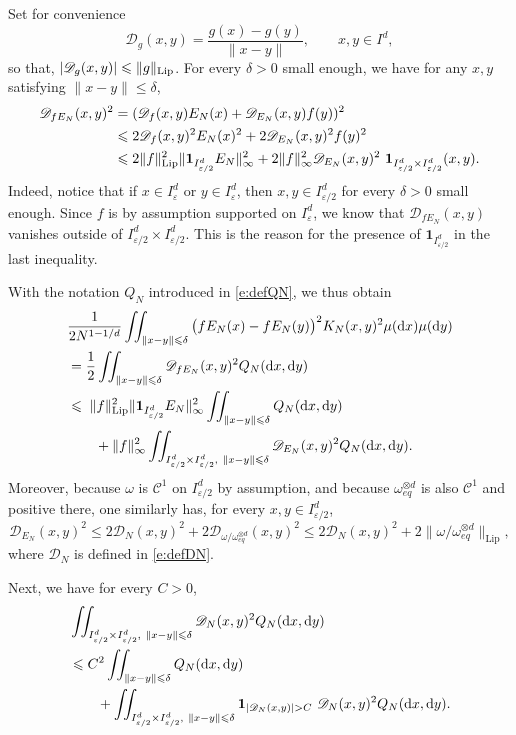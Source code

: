 \documentclass[a4paper,11pt]{article}
\numberwithin{equation}{section}
\theoremstyle{definition}
\newcommand{\eq}{\begin{equation}}
\newcommand{\qe}{\end{equation}}
\newcommand{\bs}{\boldsymbol}
\newcommand{\bv}{\mathbf}
\renewcommand{\leq}{\leqslant}
\renewcommand{\epsilon}{\varepsilon}
\renewcommand{\d}{ {\rm d}}
\def\IND{{\bs 1}}
\begin{document}
Set for convenience
\eq
\label{hey Dj !}
\mathscr D_g(x,y)= \frac{g(x)-g(y)}{\|x-y\|}, \qquad x,y\in I^d,
\qe
so that, $|\mathscr D_g(x,y)|\leq \|g\|_{\rm{Lip}}$. For every $\delta>0$ small enough, we have for any $x,y$ satisfying $\|x-y\|\leq \delta$,
\begin{align*}
\mathscr D_{f E_N}(x,y)^2 & =(\mathscr D_{f}(x,y) E_N(x)+\mathscr D_{E_N}(x,y) f(y))^2\\
& \leq 2\mathscr D_{f}(x,y)^2 E_N(x)^2+2\mathscr D_{E_N}(x,y)^2 f(y)^2\\
& \leq 2\|f\|_{\rm{Lip}}^2 \|\bs 1_{I^d_{\epsilon/2}}E_N\|_\infty^2+2\|f\|_\infty^2 \mathscr D_{E_N}(x,y)^2\ \bs 1_{I^d_{\epsilon/2}\times I^d_{\epsilon/2}}(x,y).
\end{align*}
Indeed, notice that if $x\in I^d_\epsilon$ or $y\in I^d_\epsilon$, then $x,y\in
I^d_{\epsilon/2}$ for every $\delta>0$ small enough. Since $f$ is by assumption
supported on $I^d_\epsilon$, we know that $\mathscr D_{f E_N}(x,y)$ vanishes
outside of $I^d_{\epsilon/2}\times I^d_{\epsilon/2}$. This is the reason for the
presence of $\IND_{I^d_{\epsilon/2}}$ in the last inequality.

With the notation $Q_N$ introduced in \eqref{e:defQN}, we thus obtain
\begin{align}
\label{ineq diag A}
&\frac1{2N^{1-1/d}}\iint_{\|x-y\|\leq \delta} \big(fE_N(x)-fE_N(y)\big)^2K_N(x,y)^2\mu(\d x)\mu(\d y)\nonumber\\
 & = \frac12\iint_{\|x-y\|\leq \delta} \mathscr D_{f E_N}(x,y)^2Q_N(\d x,\d y)\nonumber\\
 & \leq  \; \|f\|_{\rm{Lip}}^2 \|\bs 1_{I^d_{\epsilon/2}}E_N\|_\infty^2\iint_{\|x-y\|\leq \delta} Q_N(\d x,\d y)\\
 & \qquad +\|f\|_\infty^2 \iint_{I^d_{\epsilon/2}\times I^d_{\epsilon/2},\ \|x-y\|\leq \delta} \mathscr D_{E_N}(x,y)^2 Q_N(\d x,\d y)\nonumber.
\end{align}
Moreover,  because $\omega$ is $\mathscr C^1$ on $I_{\epsilon/2}^d$ by assumption, and because $\omega_{eq}^{\otimes d}$ is also $\mathscr C^1$ and positive there, one similarly has, for every $x,y\in I_{\epsilon/2}^d$,
\eq
\label{ineq diag B}
\mathscr D_{E_N}(x,y)^2\leq 2 \mathscr D_{N}(x,y)^2 +2 \mathscr D_{\omega/\omega_{eq}^{\otimes d}}(x,y)^2\leq 2 \mathscr D_{N}(x,y)^2 +2\|\omega/\omega_{eq}^{\otimes d}\|_{\mathrm{Lip}},
\qe
where $\mathscr D_N$ is defined in \eqref{e:defDN}.

Next, we have for every $C>0$,
\begin{align}
& \iint_{I^d_{\epsilon/2}\times I^d_{\epsilon/2},\ \|x-y\|\leq \delta} \mathscr D_{N}(x,y)^2 Q_N(\d x,\d y)\nonumber\\
& \leq C^2\iint_{\|x-y\|\leq \delta} Q_N(\d x,\d y)\nonumber\\
& \qquad + \iint_{I^d_{\epsilon/2}\times I^d_{\epsilon/2},\ \|x-y\|\leq \delta} \bv 1_{|\mathscr D_{N}(x,y)|> C}\ \mathscr D_{N}(x,y)^2 Q_N(\d x,\d y).\label{alligator427}
\end{align}
\end{document}
